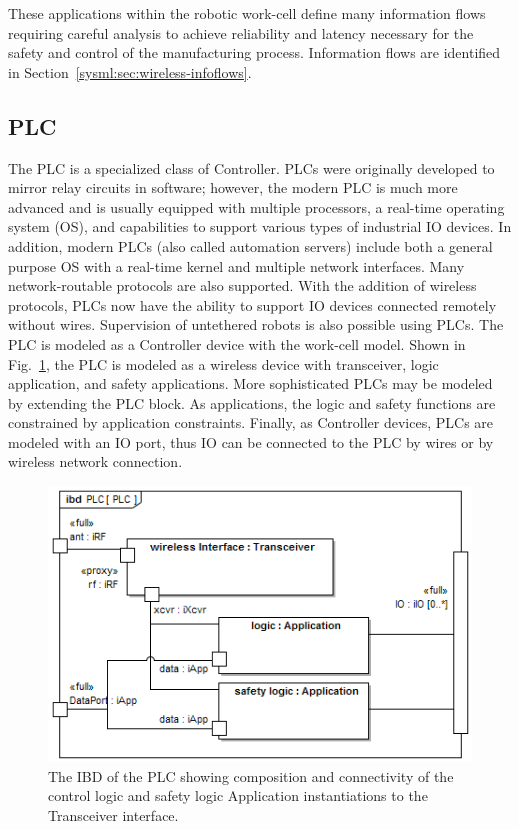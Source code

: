 These applications within the robotic work-cell define many information flows requiring careful analysis to achieve reliability and latency necessary for the safety and control of the manufacturing process. Information flows are identified in Section~\ref{sysml:sec:wireless-infoflows}.

\subsection{PLC}\label{sysml:sec:plc}
The PLC is a specialized class of Controller.  PLCs were originally developed to mirror relay circuits in software; however, the modern PLC is much more advanced and is usually equipped with multiple processors, a real-time operating system (OS), and capabilities to support various types of industrial IO devices.  In addition, modern PLCs (also called automation servers) include both a general purpose OS with a real-time kernel and multiple network interfaces.  Many network-routable protocols are also supported.  With the addition of wireless protocols, PLCs now have the ability to support IO devices connected remotely without wires.  Supervision of untethered robots is also possible using PLCs.  The PLC is modeled as a Controller device with the work-cell model.  Shown in Fig.~\ref{sysml:fig:PLC:ibd}, the PLC is modeled as a wireless device with transceiver, logic application, and safety applications.  More sophisticated PLCs may be modeled by extending the PLC block.  As applications, the logic and safety functions are constrained by application constraints. Finally, as Controller devices, PLCs are modeled with an IO port, thus IO can be connected to the PLC by wires or by wireless network connection.

\begin{figure}
	\centering
	\includegraphics[width=0.95\columnwidth]{./chapter-sysml/diagrams/ibd__PLC__PLC}
	\caption{The IBD of the PLC showing composition and connectivity of the control logic and safety logic Application instantiations to the Transceiver interface. }
	\label{sysml:fig:PLC:ibd}
\end{figure}

